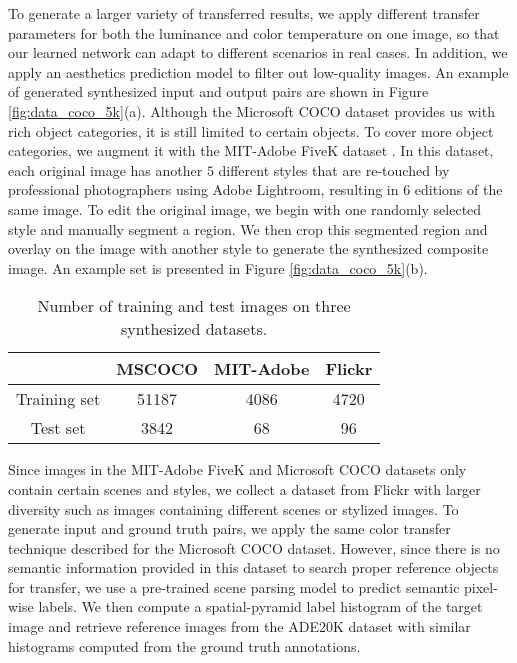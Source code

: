 \documentclass[10pt,twocolumn,letterpaper]{article}
\begin{document}
To generate a larger variety of transferred results, we apply different transfer parameters for both the luminance and color temperature on one image, so that our learned network can adapt to different scenarios in real cases.
%
In addition,  we apply an aesthetics prediction model \cite{Kong_ECCV_2016} to filter out low-quality images.
%
An example of generated synthesized input and output pairs are shown in Figure \ref{fig:data_coco_5k}(a).
%
{}
%
Although the Microsoft COCO dataset provides us with rich object categories, it is still limited to certain objects.
%
To cover more object categories, we augment it with the MIT-Adobe FiveK dataset \cite{Bychkovsky_CVPR_2011}.
%
In this dataset, each original image has another $5$ different styles that are re-touched by professional photographers using Adobe Lightroom, resulting in $6$ editions of the same image.
%
To edit the original image, we begin with one randomly selected style and manually segment a region.
%
We then crop this segmented region and overlay on the image with another style to generate the synthesized composite image.
%
An example set is presented in Figure \ref{fig:data_coco_5k}(b).
%
%
\begin{table}[t]
	\caption{Number of training and test images on three synthesized datasets.
	}
	\vspace{1mm}
	\small
	\centering
	\renewcommand{\arraystretch}{1.5}
	\setlength{\tabcolsep}{6pt}     
	\begin{tabular}{|c|c|c|c|}
		\hline
		& MSCOCO & MIT-Adobe & Flickr \\
		\hline
		
		Training set & 51187 & 4086 & 4720 \\
		\hline
		
		Test set & 3842 & 68 & 96 \\
		
		\hline
	\end{tabular}
	\label{tab:data}
\end{table}
%
{}
%
Since images in the MIT-Adobe FiveK and Microsoft COCO datasets only contain certain scenes and styles, we collect a dataset from Flickr with larger diversity such as images containing different scenes or stylized images. 
%
To generate input and ground truth pairs, we apply the same color transfer technique described for the Microsoft COCO dataset.
%
However, since there is no semantic information provided in this dataset to search proper reference objects for transfer, we use a pre-trained 
scene parsing model \cite{Zhou_corr_2016} to predict semantic pixel-wise labels.
%
We then compute a spatial-pyramid label histogram \cite{Lazebnik_CVPR_2006} of the target image and retrieve reference images from the ADE20K dataset \cite{Zhou_corr_2016} with similar histograms computed from the ground truth annotations.
%
\end{document}

